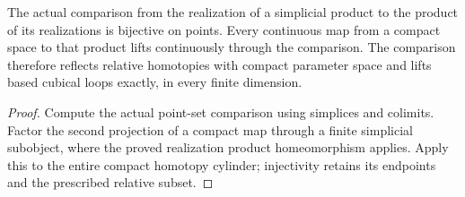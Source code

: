 \begin{proposition}
  \label{prop:actual-realization-product-weak-comparison}
  \leanok
  The actual comparison from the realization of a simplicial product to the product of its realizations is bijective on points. Every continuous map from a compact space to that product lifts continuously through the comparison. The comparison therefore reflects relative homotopies with compact parameter space and lifts based cubical loops exactly, in every finite dimension.
\end{proposition}
\begin{proof}
  Compute the actual point-set comparison using simplices and colimits. Factor the second projection of a compact map through a finite simplicial subobject, where the proved realization product homeomorphism applies. Apply this to the entire compact homotopy cylinder; injectivity retains its endpoints and the prescribed relative subset.
  \leanok
\end{proof}

